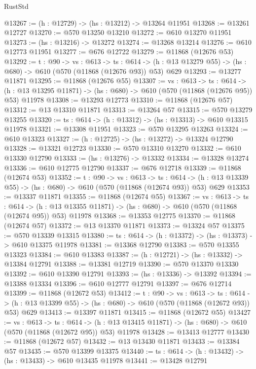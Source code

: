 \begin{lexlean}{RustStd}
\begin{coremodule}
@13267 := (h : @12729) -> (hs : @13212) -> @13264 @11951
@13268 := @13261 @12727
@13270 := @570 @13250 @13210
@13272 := @610 @13270 @11951
@13273 := (hs : @13216) -> @13272
@13274 := @13268 @13214
@13276 := @610 @12773 @11951
@13277 := @676 @12722
@13279 := @11868 (@12676 @53)
@13292 := {t : @90} ->
  {vs : @613} ->
  {ts : @614} -> (h : @13 @13279 @55) -> (hs : @680) -> @610 (@570 (@11868 (@12676 @93)) @53) @629
@13293 := @13277 @11871
@13295 := @11868 (@12676 @55)
@13307 := {vs : @613} ->
  {ts : @614} ->
  (h : @13 @13295 @11871) -> (hs : @680) -> @610 (@570 (@11868 (@12676 @95)) @53) @11978
@13308 := @13293 @12773
@13310 := @11868 (@12676 @57)
@13312 := @13 @13310 @11871
@13313 := @13264 @57
@13315 := @570 @13279 @13255
@13320 := {ts : @614} -> (h : @13312) -> (hs : @13313) -> @610 @13315 @11978
@13321 := @13308 @11951
@13323 := @570 @13295 @13263
@13324 := @610 @13323
@13327 := (h : @12725) -> (hs : @13272) -> @13324 @12790
@13328 := @13321 @12723
@13330 := @570 @13310 @13270
@13332 := @610 @13330 @12790
@13333 := (hs : @13276) -> @13332
@13334 := @13328 @13274
@13336 := @610 @12775 @12790
@13337 := @676 @12718
@13339 := @11868 (@12674 @53)
@13352 := {t : @90} ->
  {vs : @613} ->
  {ts : @614} -> (h : @13 @13339 @55) -> (hs : @680) -> @610 (@570 (@11868 (@12674 @93)) @53) @629
@13353 := @13337 @11871
@13355 := @11868 (@12674 @55)
@13367 := {vs : @613} ->
  {ts : @614} ->
  (h : @13 @13355 @11871) -> (hs : @680) -> @610 (@570 (@11868 (@12674 @95)) @53) @11978
@13368 := @13353 @12775
@13370 := @11868 (@12674 @57)
@13372 := @13 @13370 @11871
@13373 := @13324 @57
@13375 := @570 @13339 @13315
@13380 := {ts : @614} -> (h : @13372) -> (hs : @13373) -> @610 @13375 @11978
@13381 := @13368 @12790
@13383 := @570 @13355 @13323
@13384 := @610 @13383
@13387 := (h : @12721) -> (hs : @13332) -> @13384 @12791
@13388 := @13381 @12719
@13390 := @570 @13370 @13330
@13392 := @610 @13390 @12791
@13393 := (hs : @13336) -> @13392
@13394 := @13388 @13334
@13396 := @610 @12777 @12791
@13397 := @676 @12714
@13399 := @11868 (@12672 @53)
@13412 := {t : @90} ->
  {vs : @613} ->
  {ts : @614} -> (h : @13 @13399 @55) -> (hs : @680) -> @610 (@570 (@11868 (@12672 @93)) @53) @629
@13413 := @13397 @11871
@13415 := @11868 (@12672 @55)
@13427 := {vs : @613} ->
  {ts : @614} ->
  (h : @13 @13415 @11871) -> (hs : @680) -> @610 (@570 (@11868 (@12672 @95)) @53) @11978
@13428 := @13413 @12777
@13430 := @11868 (@12672 @57)
@13432 := @13 @13430 @11871
@13433 := @13384 @57
@13435 := @570 @13399 @13375
@13440 := {ts : @614} -> (h : @13432) -> (hs : @13433) -> @610 @13435 @11978
@13441 := @13428 @12791

\end{coremodule}
\end{lexlean}
